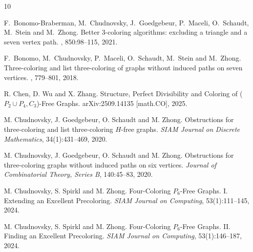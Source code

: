 \documentclass[11pt,a4paper]{article}
\theoremstyle{definition}
\begin{document}


\begin{thebibliography}{10}


        F.~Bonomo-Braberman, M.~Chudnovsky, J.~Goedgebeur,
        P.~Maceli,
        O.~Schaudt, M.~Stein and M.~Zhong. 
        \newblock Better 3-coloring algorithms: excluding a triangle and a seven vertex path. 
        , 850:98--115, 2021.

        F.~Bonomo, M.~Chudnovsky, P.~Maceli, O.~Schaudt, M.~Stein and M.~Zhong. 
        \newblock Three-coloring and list three-coloring of graphs without induced paths on seven vertices. 
        , 779--801, 2018.
        

        R. Chen, D. Wu and X. Zhang.
        Structure, Perfect Divisibility and Coloring of ($ P_2 \cup P_4, C_3 $)-Free Graphs.
        \newblock arXiv:2509.14135 [math.CO], 2025.

        M. Chudnovsky, J. Goedgebeur, O. Schaudt and M. Zhong.
		Obstructions for three-coloring and list three-coloring $H$-free graphs.
		{\em SIAM Journal on Discrete Mathematics}, 34(1):431--469, 2020. 

        M. Chudnovsky, J. Goedgebeur, O. Schaudt and M. Zhong.
		Obstructions for three-coloring graphs without induced paths on six vertices.
		{\em Journal of Combinatorial Theory, Series B}, 140:45--83, 2020. 
        
         M. Chudnovsky, S. Spirkl and M. Zhong.
		Four-Coloring $P_6$-Free Graphs. I. Extending an Excellent Precoloring.
		{\em SIAM Journal on Computing}, 53(1):111--145, 2024. 
		
		 M. Chudnovsky, S. Spirkl and M. Zhong.
		Four-Coloring $P_6$-Free Graphs. II. Finding an Excellent Precoloring.
		{\em SIAM Journal on Computing}, 53(1):146--187, 2024. 



\end{thebibliography}
\end{document}
